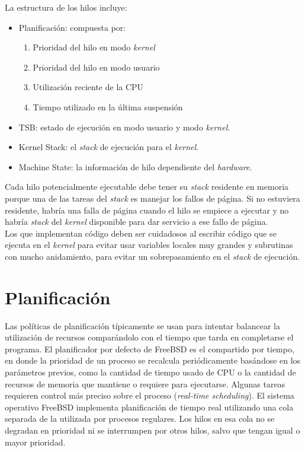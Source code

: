 \documentclass[a4paper]{book}
\begin{document}
La estructura de los hilos incluye:

\begin{itemize}
\item Planificación: compuesta por:
	\begin{enumerate}
		\item Prioridad del hilo en modo \emph{kernel}
		\item Prioridad del hilo en modo usuario
		\item Utilización reciente de la CPU
		\item Tiempo utilizado en la última suspensión
	\end{enumerate}
\item TSB: estado de ejecución en modo usuario y modo \emph{kernel}.
\item Kernel Stack: el \emph{stack} de ejecución para el \emph{kernel}.
\item Machine State: la información de hilo dependiente del \emph{hardware}.
\end{itemize}

Cada hilo potencialmente ejecutable debe tener su \emph{stack} residente en memoria porque una de las tareas del \emph{stack} es manejar los fallos de página. Si no estuviera residente, habría una falla de página cuando el hilo se empiece a ejecutar y no habría \emph{stack} del \emph{kernel} disponible para dar servicio a ese fallo de página.\\

Los que implementan código deben ser cuidadosos al escribir código que se ejecuta en el \emph{kernel} para evitar usar variables locales muy grandes y subrutinas con mucho anidamiento, para evitar un sobrepasamiento en el \emph{stack} de ejecución.

\section{Planificaci\'on}

Las políticas de planificaci\'on típicamente se usan para intentar balancear la utilización de recursos compar\'andolo con el tiempo que tarda en completarse el programa. El planificador por defecto de FreeBSD es el compartido por tiempo, en donde la prioridad de un proceso se recalcula peri\'odicamente bas\'andose en los parámetros previos, como la cantidad de tiempo usado de CPU o la cantidad de recursos de memoria que mantiene o requiere para ejecutarse. Algunas tareas requieren control más preciso sobre el proceso (\emph{real-time scheduling}). El sistema operativo FreeBSD implementa planificación de tiempo real utilizando una cola separada de la utilizada por procesos regulares. Los hilos en esa cola no se degradan en prioridad ni se interrumpen por otros hilos, salvo que tengan igual o mayor prioridad.\\
\end{document}
